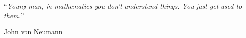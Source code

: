 


\vspace*{0.2\textheight}

\noindent\enquote{\itshape Young man, in mathematics you don't understand things. You just get used to them.}\bigbreak

\hfill John von Neumann
